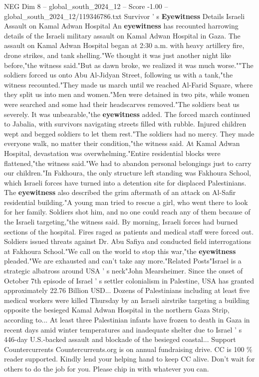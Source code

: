 \begin{textsample}{NEG Dim 8 – global\_south\_2024\_12 – Score -1.00 – global\_south\_2024\_12/119346786.txt}
Survivor ' s \textbf{Eyewitness} Details Israeli Assault on Kamal Adwan Hospital An \textbf{eyewitness} has recounted harrowing details of the Israeli military assault on Kamal Adwan Hospital in Gaza.
The assault on Kamal Adwan Hospital began at 2:30 a.m. with heavy artillery fire, drone strikes, and tank shelling."We thought it was just another night like before,"the witness said."But as dawn broke, we realized it was much worse.""The soldiers forced us onto Abu Al-Jidyan Street, following us with a tank,"the witness recounted."They made us march until we reached Al-Farid Square, where they split us into men and women."Men were detained in two pits, while women were searched and some had their headscarves removed."The soldiers beat us severely.
It was unbearable,"the \textbf{eyewitness} added.
The forced march continued to Jabalia, with survivors navigating streets filled with rubble.
Injured children wept and begged soldiers to let them rest."The soldiers had no mercy.
They made everyone walk, no matter their condition,"the witness said.
At Kamal Adwan Hospital, devastation was overwhelming."Entire residential blocks were flattened,"the witness said."We had to abandon personal belongings just to carry our children."In Fakhoura, the only structure left standing was Fakhoura School, which Israeli forces have turned into a detention site for displaced Palestinians.
The \textbf{eyewitness} also described the grim aftermath of an attack on Al-Safir residential building."A young man tried to rescue a girl, who went there to look for her family.
Soldiers shot him, and no one could reach any of them because of the Israeli targeting,"the witness said.
By morning, Israeli forces had burned sections of the hospital.
Fires raged as patients and medical staff were forced out.
Soldiers issued threats against Dr.
Abu Safiya and conducted field interrogations at Fakhoura School."We call on the world to stop this war,"the \textbf{eyewitness} pleaded."We are exhausted and can't take any more."Related Posts"Israel is a strategic albatross around USA ' s neck"John Mearsheimer.
Since the onset of October 7th episode of Israel ' s settler colonialism in Palestine, USA has granted approximately 22.76 Billion USD...
Dozens of Palestinians including at least five medical workers were killed Thursday by an Israeli airstrike targeting a building opposite the besieged Kamal Adwan Hospital in the northern Gaza Strip, according to...
At least three Palestinian infants have frozen to death in Gaza in recent days amid winter temperatures and inadequate shelter due to Israel ' s 446-day U.S.-backed assault and blockade of the besieged coastal...
Support Countercurrents Countercurrents.org is on annual fundraising drive.
CC is 100 \% reader supported.
Kindly lend your helping hand to keep CC alive.
Don't wait for others to do the job for you.
Please chip in with whatever you can.

\end{textsample}
